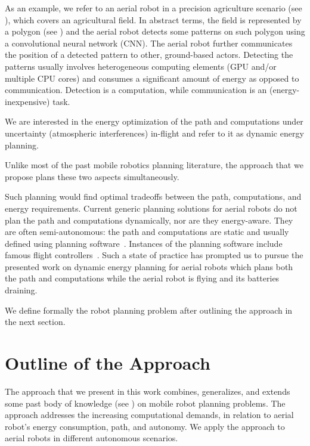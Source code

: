 As an example, we refer to an aerial robot in a precision agriculture scenario (see ), which covers an agricultural field. In abstract terms, the field is represented by a polygon (see ) and the aerial robot detects some patterns on such polygon using a convolutional neural network (CNN). The aerial robot further communicates the position of a detected pattern to other, ground-based actors. Detecting the patterns usually involves heterogeneous computing elements (GPU and/or multiple CPU cores) and consumes a significant amount of energy as opposed to communication. Detection is a computation, while communication is an (energy-inexpensive) task.

We are interested in the energy optimization of the path and computations under uncertainty (atmospheric interferences) in-flight and refer to it as dynamic energy planning.

Unlike most of the past mobile robotics planning literature, the approach that we propose plans these two aspects simultaneously. 

Such planning would find optimal tradeoffs between the path, computations, and energy requirements. Current generic planning solutions for aerial robots do not plan the path and computations dynamically, nor are they energy-aware. They are often semi-autonomous: the path and computations are static and usually defined using planning software~\citep{daponte2019review}. Instances of the planning software include famous flight controllers~\citep{px4,papa}. Such a state of practice has prompted us to pursue the presented work on dynamic energy planning for aerial robots which plans both the path and computations while the aerial robot is flying and its batteries draining. 

We define formally the robot planning problem after outlining the approach in the next section.


\section{Outline of the Approach}
\label{sec:outline}

The approach that we present in this work combines, generalizes, and extends some past body of knowledge (see ) on mobile robot planning problems. The approach addresses the increasing computational demands, in relation to aerial robot's energy consumption, path, and autonomy. We apply the approach to aerial robots in different autonomous scenarios. 

